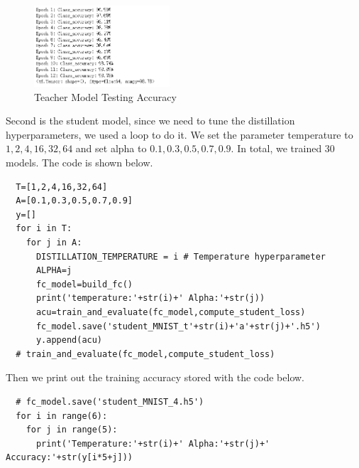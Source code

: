 \documentclass[conference]{IEEEtran}
\begin{document}
  \begin{figure}[h] 
      \centering
      \includegraphics[width=0.45\textwidth]{./graphs/teacher_accuracy_mnist.png}
      \caption{Teacher Model Testing Accuracy}
      \label{Fig.t1q3e}
  \end{figure}
  Second is the student model, since we need to tune the distillation hyperparameters, we used a loop to do it.
  We set the parameter temperature to $1,2,4,16,32,64$ and set alpha to $0.1,0.3,0.5,0.7,0.9$. In total, we trained 30 models.
  The code is shown below.
  \begin{lstlisting}
  T=[1,2,4,16,32,64]
  A=[0.1,0.3,0.5,0.7,0.9]
  y=[]
  for i in T:
    for j in A:
      DISTILLATION_TEMPERATURE = i # Temperature hyperparameter
      ALPHA=j
      fc_model=build_fc()
      print('temperature:'+str(i)+' Alpha:'+str(j))
      acu=train_and_evaluate(fc_model,compute_student_loss)
      fc_model.save('student_MNIST_t'+str(i)+'a'+str(j)+'.h5')
      y.append(acu)
  # train_and_evaluate(fc_model,compute_student_loss)
  \end{lstlisting}
  Then we print out the training accuracy stored with the code below.
  \begin{lstlisting}
  # fc_model.save('student_MNIST_4.h5')
  for i in range(6):
    for j in range(5):
      print('Temperature:'+str(i)+' Alpha:'+str(j)+' Accuracy:'+str(y[i*5+j]))
  \end{lstlisting}
  
\end{document}
